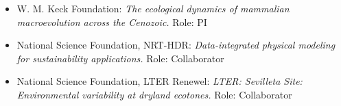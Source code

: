 \documentclass[margin,line,12pt]{res}
\begin{document}
\begin{resume}
\begin{itemize}




\item W. M. Keck Foundation: \emph{The ecological dynamics of mammalian macroevolution across the Cenozoic.} Role: PI


\item National Science Foundation, NRT-HDR: \emph{Data-integrated physical modeling for sustainability applications.} Role: Collaborator


\item National Science Foundation, LTER Renewel: \emph{LTER: Sevilleta Site: Environmental variability at dryland ecotones.} Role: Collaborator
\end{itemize}








\end{resume}
\end{document}
